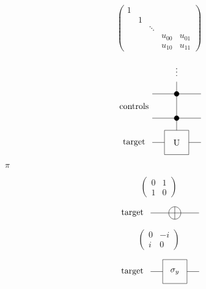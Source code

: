 \documentclass{article}
\begin{document}
\[
\begin{pmatrix}
1 \\
& 1 \\\
& & \ddots \\
& & & u_{00} & u_{01}\\
& & & u_{10} & u_{11}
\end{pmatrix}
\]
\pagebreak

\[
             \begin{tikzpicture}[scale=.5]
             \node[draw=none] at (-3.5, 3) {controls};
             \node[draw=none] at (-3.5, 0) {target};

             \node[draw=none] at (0, 6) {$\vdots$};
             \draw (0, 5) -- (0, 4);
             
             \draw (-2, 4) -- (2, 4);
             \draw[fill=black] (0, 4) circle (.2);
             \draw (0, 4) -- (0, 2);         
             
             \draw (-2, 2) -- (2, 2);
             \draw[fill=black] (0, 2) circle (.2);
             \draw (0, 2) -- (0, 1);
             
             \draw (-2,0) -- (-1, 0);
             \draw (1, 0) -- (2, 0);
             \draw (-1,-1)--(-1,1)--(1,1)--(1,-1)--cycle;
             \node[draw=none] at (0, 0) {U};
             \end{tikzpicture}
 \]
\pagebreak

$\pi$
\pagebreak

\[
\begin{pmatrix}
0 & 1 \\
1 & 0
\end{pmatrix}
\]
\pagebreak

\[
             \begin{tikzpicture}[scale=.5]
             \node[draw=none] at (-3.5, 0) {target};

             \draw (-2,0) -- (2, 0);
             \draw (0, 0) circle (.5);
             \draw (0, .5) -- (0, -.5);
             \end{tikzpicture}
 \]
\pagebreak

\[
\begin{pmatrix}
0 & -i \\
i & 0
\end{pmatrix}
\]
\pagebreak

\[
             \begin{tikzpicture}[scale=.5]
             \node[draw=none] at (-3.5, 0) {target};

             \draw (-2,0) -- (-1, 0);
             \draw (1, 0) -- (2, 0);
             \draw (-1,-1)--(-1,1)--(1,1)--(1,-1)--cycle;
             \node[draw=none] at (0, 0) {$\sigma_y$};
             \end{tikzpicture}
 \]
\pagebreak
\end{document}
